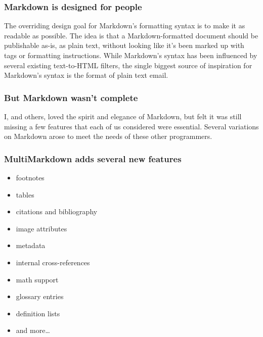 \begin{frame}[fragile]
\frametitle{Markdown is designed for people }
\label{markdownisdesignedforpeople}

The overriding design goal for Markdown's formatting syntax is to make it as
readable as possible. The idea is that a Markdown-formatted document should be
publishable as-is, as plain text, without looking like it's been marked up
with tags or formatting instructions. While Markdown's syntax has been
influenced by several existing text-to-HTML filters, the single biggest source
of inspiration for Markdown's syntax is the format of plain text email.
~\citep{gruber}

\end{frame}

\begin{frame}[fragile]
\frametitle{But Markdown wasn't complete }
\label{butmarkdownwasntcomplete}

I, and others, loved the spirit and elegance of Markdown, but felt it was
still missing a few features that each of us considered were essential.
Several variations on Markdown arose to meet the needs of these other
programmers.

\end{frame}

\begin{frame}[fragile]
\frametitle{MultiMarkdown adds several new features }
\label{multimarkdownaddsseveralnewfeatures}

\begin{itemize}
\item{} footnotes

\item{} tables

\item{} citations and bibliography

\item{} image attributes

\item{} metadata

\item{} internal cross-references

\item{} math support

\item{} glossary entries

\item{} definition lists

\item{} and more{\ldots}

\end{itemize}

\end{frame}

